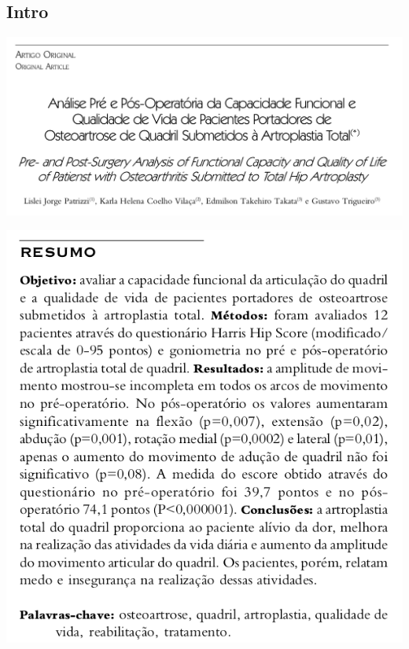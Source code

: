 \documentclass{beamer}
\begin{document}
\subsection{Intro}

\begin{frame}{}
  \begin{center}
    \includegraphics[width=.9\textwidth]{figuras/titulo}
  \end{center}
\end{frame}

\begin{frame}{}
  \begin{center}
    \includegraphics[height=.9\textheight]{figuras/resumo}
  \end{center}
\end{frame}
\end{document}
